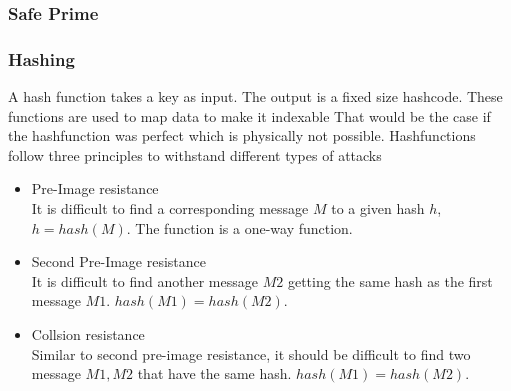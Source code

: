 \documentclass[journal]{IEEEtran}
\begin{document}
\subsubsection{Safe Prime}
\subsubsection{Hashing}
    A hash function takes a key as input.
    The output is a fixed size hashcode.
    These functions are used to map data to make it indexable 
    That would be the case if the hashfunction was perfect which is physically not possible.
    Hashfunctions follow three principles to withstand different types of attacks
    \begin{itemize}[]
        \item Pre-Image resistance \\
        It is difficult to find a corresponding message $M$ to a given hash $h$, $h=hash(M)$.
        The function is a one-way function.
        \item Second Pre-Image resistance \\
        It is difficult to find another message $M2$ getting the same hash as the first message $M1$. $hash(M1)=hash(M2)$.
        \item Collsion resistance \\
        Similar to second pre-image resistance, it should be difficult to find two message $M1,M2$ that have the same hash. $hash(M1)=hash(M2)$.
    \end{itemize}
\end{document}

